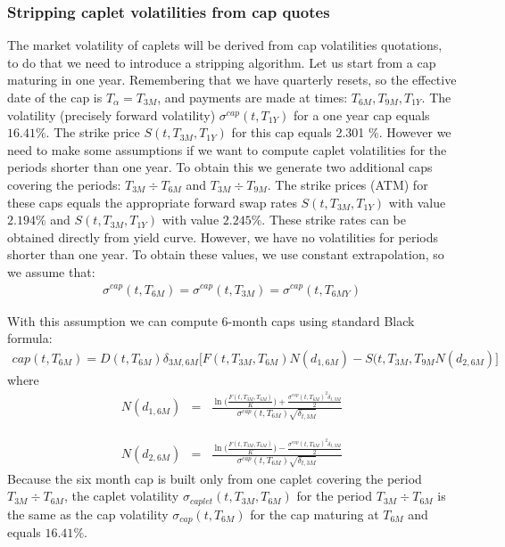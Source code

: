 \documentclass[11pt]{article}
\numberwithin{equation}{subsection}
\begin{document}
\subsubsection{Stripping caplet volatilities from cap quotes}
The market volatility of caplets will be derived from cap volatilities quotations, to do that
we need to introduce a stripping algorithm.
Let us start from a cap maturing in one year. Remembering that we have quarterly resets,
so the effective date of the cap is \(T_{\alpha} =T_{3M}\), and payments are made at times: \(T_{6M}, T_{9M}, T_{1Y}\).
The volatility (precisely forward volatility) \(\sigma^{cap}(t, T_{1Y})\) for a one year cap equals \(16.41\%\).
The strike price \(S(t, T_{3M}, T_{1Y})\) for this cap equals 2.301 \%. However we need to make
some assumptions if we want to compute caplet volatilities for the periods shorter than
one year. To obtain this we generate two additional caps covering the periods: \(T_{3M} \div T_{6M}\)
and \(T_{3M} \div T_{9M}\). The strike prices (ATM) for these caps equals the appropriate forward
swap rates \(S(t, T_{3M}, T_{1Y})\) with value \(2.194\%\) and \(S(t, T_{3M}, T_{1Y})\) with value \(2.245\%\). These
strike rates can be obtained directly from yield curve. However, we have no volatilities for
periods shorter than one year. To obtain these values, we use constant extrapolation, so
we assume that: 
\begin{eqnarray*}
\sigma^{cap}(t, T_{6M}) = \sigma^{cap}(t, T_{3M}) = \sigma^{cap}(t, T_{6MY}) 
\end{eqnarray*}

With this assumption we can
compute 6-month caps using standard Black formula:
\begin{eqnarray*}
	cap(t, T_{6M}) = D(t, T_{6M}) \delta_{3M,6M} \big[ F(t, T_{3M}, T_{6M}) N(d_{1,6M}) - S(t, T_{3M}, T_{9M}N(d_{2,6M}) \big]
\end{eqnarray*}
where 
\begin{eqnarray*}
	N(d_{1,6M})&=&\frac{\ln\Big(\frac{F(t, T_{3M}, T_{6M})}{K}\Big) + \frac{\sigma^{cap}(t, T_{6M})^2\delta_{t, 3M}}{2}}{\sigma^{cap}(t, T_{6M})\sqrt{\delta_{t,3M}}}
\end{eqnarray*}

\begin{eqnarray*}
	N(d_{2,6M})&=&\frac{\ln\Big(\frac{F(t, T_{3M}, T_{6M})}{K}\Big) - \frac{\sigma^{cap}(t, T_{6M})^2\delta_{t, 3M}}{2}}{\sigma^{cap}(t, T_{6M})\sqrt{\delta_{t,3M}}}
\end{eqnarray*}
Because the six month cap is built only from one caplet covering the period \(T_{3M} \div T_{6M}\), the caplet volatility \(\sigma_{caplet}(t, T_{3M}, T_{6M})\) for the period \(T_{3M} ÷T_{6M}\) is the same as the cap volatility \(\sigma_{cap}(t, T_{6M})\) for the cap maturing at \(T_{6M}\) and equals \(16.41\%\).
\end{document}
